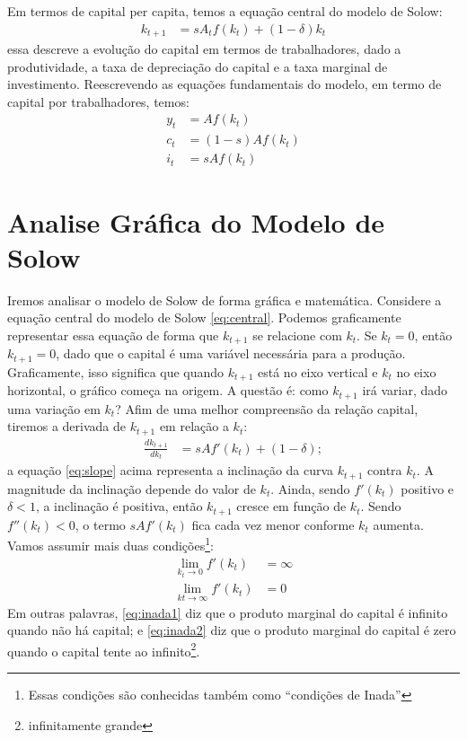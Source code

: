 \documentclass[11pt,a4paper]{article}
\begin{document}
Em termos de capital per capita, temos a equação central do modelo de Solow:
\begin{align}
k_{t+1} &= s A_t f(k_t) + (1-\delta)k_t \label{eq:central}
\end{align}
\noindent
essa descreve a evolução do capital em termos de trabalhadores, dado a produtividade, a taxa de depreciação do capital e a taxa marginal de investimento. Reescrevendo as equações fundamentais do modelo, em termo de capital por trabalhadores, temos:
\begin{align}
y_t &= Af(k_t)\\
c_t &= (1-s)Af(k_t)\\
i_t &= sAf(k_t)
\end{align}  

\section{Analise Gráfica do Modelo de Solow}
Iremos analisar o modelo de Solow de forma gráfica e matemática. Considere a equação central do modelo de Solow \ref{eq:central}. Podemos graficamente representar essa equação de forma que $k_{t+1}$ se relacione com $k_t$. Se $k_t = 0$, então $k_{t+1}=0$, dado que o capital é uma variável necessária para a produção. Graficamente, isso significa que quando $k_{t+1}$ está no eixo vertical e $k_t$ no eixo horizontal, o gráfico começa na origem. A questão é: como $k_{t+1}$ irá variar, dado uma variação em $k_t$? Afim de uma melhor compreensão da relação capital, tiremos a derivada de $k_{t+1}$ em relação a $k_t$:
\begin{align}
\frac{dk_{t+1}}{dk_t} &= sAf'(k_t) + (1-\delta); \label{eq:slope}
\end{align}
\noindent
a equação \ref{eq:slope} acima representa a inclinação da curva $k_{t+1}$ contra $k_t$. A magnitude da inclinação depende do valor de $k_t$. Ainda, sendo $f'(k_t)$ positivo e $\delta < 1$, a inclinação é positiva, então $k_{t+1}$ cresce em função de $k_t$. Sendo $f''(k_t)<0$, o termo $sAf'(k_t)$ fica cada vez menor conforme $k_t$ aumenta. Vamos assumir mais duas condições\footnote{Essas condições são conhecidas também como ``condições de Inada''}:
\begin{align}\label{eq:inada1}
\lim_{k_t \to 0} f'(k_t) &= \infty\\ \label{eq:inada2}
\lim_{kt \to \infty} f'(k_t) &= 0 
\end{align}	
Em outras palavras, \ref{eq:inada1} diz que o produto marginal do capital é infinito quando não há capital; e \ref{eq:inada2} diz que o produto marginal do capital é zero quando o capital tente ao infinito\footnote{infinitamente grande}.\\
\end{document}
